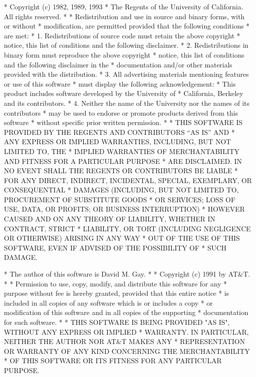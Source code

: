 \begin{copyrightEnv}
 * Copyright (c) 1982, 1989, 1993
 *      The Regents of the University of California.  All rights reserved.
 *
 * Redistribution and use in source and binary forms, with or without
 * modification, are permitted provided that the following conditions
 * are met:
 * 1. Redistributions of source code must retain the above copyright
 *    notice, this list of conditions and the following disclaimer.
 * 2. Redistributions in binary form must reproduce the above copyright
 *    notice, this list of conditions and the following disclaimer in the
 *    documentation and/or other materials provided with the distribution.
 * 3. All advertising materials mentioning features or use of this software
 *    must display the following acknowledgement:
 *      This product includes software developed by the University of
 *      California, Berkeley and its contributors.
 * 4. Neither the name of the University nor the names of its contributors
 *    may be used to endorse or promote products derived from this software
 *    without specific prior written permission.
 *
 * THIS SOFTWARE IS PROVIDED BY THE REGENTS AND CONTRIBUTORS ``AS IS'' AND
 * ANY EXPRESS OR IMPLIED WARRANTIES, INCLUDING, BUT NOT LIMITED TO, THE
 * IMPLIED WARRANTIES OF MERCHANTABILITY AND FITNESS FOR A PARTICULAR PURPOSE
 * ARE DISCLAIMED.  IN NO EVENT SHALL THE REGENTS OR CONTRIBUTORS BE LIABLE
 * FOR ANY DIRECT, INDIRECT, INCIDENTAL, SPECIAL, EXEMPLARY, OR CONSEQUENTIAL
 * DAMAGES (INCLUDING, BUT NOT LIMITED TO, PROCUREMENT OF SUBSTITUTE GOODS
 * OR SERVICES; LOSS OF USE, DATA, OR PROFITS; OR BUSINESS INTERRUPTION)
 * HOWEVER CAUSED AND ON ANY THEORY OF LIABILITY, WHETHER IN CONTRACT, STRICT
 * LIABILITY, OR TORT (INCLUDING NEGLIGENCE OR OTHERWISE) ARISING IN ANY WAY
 * OUT OF THE USE OF THIS SOFTWARE, EVEN IF ADVISED OF THE POSSIBILITY OF
 * SUCH DAMAGE.
\end{copyrightEnv}

\begin{copyrightEnv}
 * The author of this software is David M. Gay.
 *
 * Copyright (c) 1991 by AT&T.
 *
 * Permission to use, copy, modify, and distribute this software for any
 * purpose without fee is hereby granted, provided that this entire notice
 * is included in all copies of any software which is or includes a copy
 * or modification of this software and in all copies of the supporting
 * documentation for such software.
 *
 * THIS SOFTWARE IS BEING PROVIDED "AS IS", WITHOUT ANY EXPRESS OR IMPLIED
 * WARRANTY.  IN PARTICULAR, NEITHER THE AUTHOR NOR AT&T MAKES ANY
 * REPRESENTATION OR WARRANTY OF ANY KIND CONCERNING THE MERCHANTABILITY
 * OF THIS SOFTWARE OR ITS FITNESS FOR ANY PARTICULAR PURPOSE.
\end{copyrightEnv}

